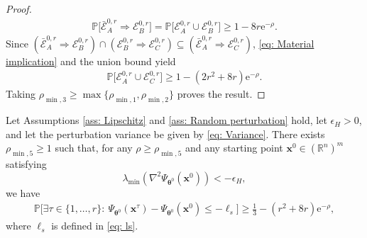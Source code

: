 \documentclass{siamart251216}
\begin{document}
\begin{proof}
    \begin{gather*}
        \mathbb{P}\Big[\bar{\mathcal{E}}_{A}^{0,r}\Rightarrow\mathcal{E}_{B}^{0,r}\Big]
        =\mathbb{P}\Big[\mathcal{E}_{A}^{0,r}\cup\mathcal{E}_{B}^{0,r}\Big]
        \geq1-8r\mathrm{e}^{-\rho}.
    \end{gather*}
    Since $(\bar{\mathcal{E}}_{A}^{0,r}\Rightarrow\mathcal{E}_{B}^{0,r})\cap(\mathcal{E}_{B}^{0,r}\Rightarrow\mathcal{E}_{C}^{0,r})\subseteq(\bar{\mathcal{E}}_{A}^{0,r}\Rightarrow\mathcal{E}_{C}^{0,r})$, \eqref{eq: Material implication} and the union bound yield
    \begin{gather*}
        \mathbb{P}\Big[\mathcal{E}_{A}^{0,r}\cup\mathcal{E}_{C}^{0,r}\Big]
        \geq1-(2r^{2}+8r)\mathrm{e}^{-\rho}.
    \end{gather*}
    Taking $\rho_{\min,3}\geq\max\{\rho_{\min,1},\rho_{\min,2}\}$ proves the result.
\end{proof}

\begin{lemma}
    \label{lem: Decrease for saddle by coupling}
    Let Assumptions \ref{ass: Lipschitz} and \ref{ass: Random perturbation} hold, let $\epsilon_H>0$, and let the perturbation variance be given by \eqref{eq: Variance}. There exists $\rho_{\min,5}\geq1$ such that, for any $\rho\geq\rho_{\min,5}$ and any starting point $\mathbf{x}^{0}\in(\mathbb{R}^{n})^{m}$ satisfying
    \[
        \lambda_{\min}\!\left(\nabla^{2}\Psi_{\boldsymbol{\theta}^{0}}(\mathbf{x}^{0})\right)<-\epsilon_H,
    \]
    we have
    \begin{gather*}
        \mathbb{P}\Big[\exists\tau\in\{1,\ldots,r\}:~
        \Psi_{\boldsymbol{\theta}^{0}}(\mathbf{x}^{\tau})-\Psi_{\boldsymbol{\theta}^{0}}(\mathbf{x}^{0})
        \leq-\ell_s\Big]
        \geq\frac{1}{3}-(r^{2}+8r)\mathrm{e}^{-\rho},
    \end{gather*}
    where $\ell_s$ is defined in \eqref{eq: ls}.
\end{lemma}
\end{document}
